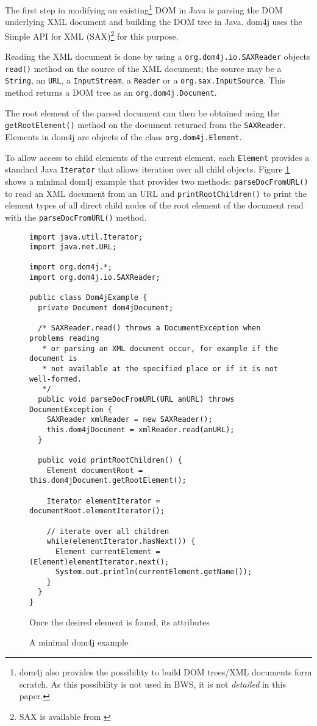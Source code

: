 The first step in modifying an existing\footnote{dom4j also provides the possibility to build DOM trees/XML documents form scratch. As this possibility is not used in BWS, it is not \emph{detailed} in this paper.}  DOM in Java is parsing the DOM underlying XML document and building the DOM tree in Java. dom4j uses the Simple API for XML (SAX)\footnote{SAX is available from \cite{SaxHP}} for this purpose.


Reading the XML document is done by using a \texttt{org.dom4j.io.SAXReader} objects \texttt{read()} method on the source of the XML document; the source may be a \texttt{String}, an \texttt{URL}, a \texttt{InputStream}, a \texttt{Reader} or a \texttt{org.sax.InputSource}. This method returns a DOM tree as an \texttt{org.dom4j.Document}.

The root element of the parsed document can then be obtained using the \texttt{getRootElement()} method on the document returned from the \texttt{SAXReader}. Elements in dom4j are objects of the class \texttt{org.dom4j.Element}.

To allow access to child elements of the current element, each \texttt{Element} provides a standard Java \texttt{Iterator} that allows iteration over all child objects. Figure \ref{fig:AMinimalDom4jExample} shows a minimal dom4j example that provides two methods: \texttt{parseDocFromURL()} to read an XML document from an URL and \texttt{printRootChildren()} to print the element types of all direct child nodes of the root element of the document read with the \texttt{parseDocFromURL()} method.

\begin{figure}[htb]
  \begin{verbatim}
import java.util.Iterator;
import java.net.URL;

import org.dom4j.*;
import org.dom4j.io.SAXReader;

public class Dom4jExample {
  private Document dom4jDocument;
  
  /* SAXReader.read() throws a DocumentException when problems reading
   * or parsing an XML document occur, for example if the document is
   * not available at the specified place or if it is not well-formed.
   */
  public void parseDocFromURL(URL anURL) throws DocumentException {
    SAXReader xmlReader = new SAXReader();
    this.dom4jDocument = xmlReader.read(anURL);
  }
  
  public void printRootChildren() {
    Element documentRoot = this.dom4jDocument.getRootElement();
    
    Iterator elementIterator = documentRoot.elementIterator();
    
    // iterate over all children
    while(elementIterator.hasNext()) {
      Element currentElement = (Element)elementIterator.next();
      System.out.println(currentElement.getName());
    }
  }
}
  \end{verbatim}

Once the desired element is found, its attributes 

	\caption{A minimal dom4j example}
	\label{fig:AMinimalDom4jExample}
\end{figure}


